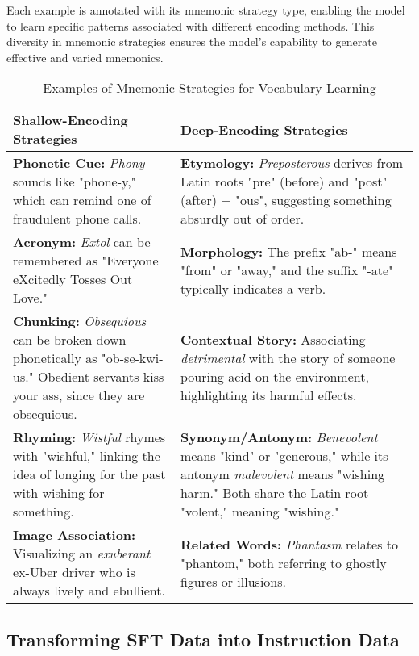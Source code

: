 \documentclass[11pt, onecolumn]{article}
\begin{document}
Each example is annotated with its mnemonic strategy type, enabling the model to learn specific patterns associated with different encoding methods. This diversity in mnemonic strategies ensures the model's capability to generate effective and varied mnemonics.

\begin{table*}[ht]
\centering
\begin{tabular}{p{} p{}}
\textbf{Shallow-Encoding Strategies} & \textbf{Deep-Encoding Strategies} \\
\hline
\textbf{Phonetic Cue:} \textit{Phony} sounds like "phone-y," which can remind one of fraudulent phone calls. & \textbf{Etymology:} \textit{Preposterous} derives from Latin roots "pre" (before) and "post" (after) + "ous", suggesting something absurdly out of order. \\
\textbf{Acronym:} \textit{Extol} can be remembered as "Everyone eXcitedly Tosses Out Love." & \textbf{Morphology:} The prefix "ab-" means "from" or "away," and the suffix "-ate" typically indicates a verb. \\
\textbf{Chunking:} \textit{Obsequious} can be broken down phonetically as "ob-se-kwi-us." Obedient servants kiss your ass, since they are obsequious. & \textbf{Contextual Story:} Associating \textit{detrimental} with the story of someone pouring acid on the environment, highlighting its harmful effects. \\
\textbf{Rhyming:} \textit{Wistful} rhymes with "wishful," linking the idea of longing for the past with wishing for something. & \textbf{Synonym/Antonym:} \textit{Benevolent} means "kind" or "generous," while its antonym \textit{malevolent} means "wishing harm." Both share the Latin root "volent," meaning "wishing." \\
\textbf{Image Association:} Visualizing an \textit{exuberant} ex-Uber driver who is always lively and ebullient. & \textbf{Related Words:} \textit{Phantasm} relates to "phantom," both referring to ghostly figures or illusions. \\
\end{tabular}
\caption{Examples of Mnemonic Strategies for Vocabulary Learning}
\label{tab:mnemonic-strategies}
\end{table*}

\subsection{Transforming SFT Data into Instruction Data} \label{sec:met-instruction-data}
\end{document}
